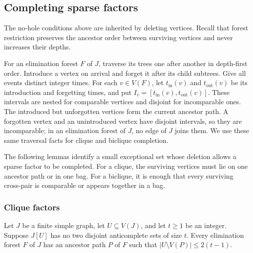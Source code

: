 \subsection{Completing sparse factors}

The no-hole conditions above are inherited by deleting vertices. Recall that
forest restriction preserves the ancestor order between surviving
vertices and never increases their depths.

For an elimination forest $F$ of $J$, traverse its trees one after
another in depth-first order. Introduce a vertex on arrival and forget it after
its child subtrees. Give all events distinct integer times. For each
$v\in V(F)$, let $t_{\mathrm{in}}(v)$ and $t_{\mathrm{out}}(v)$ be its
introduction and forgetting times, and put
$I_v=[t_{\mathrm{in}}(v),t_{\mathrm{out}}(v)]$. These intervals are
nested for comparable vertices and disjoint for incomparable ones.
The introduced but unforgotten vertices form the current ancestor
path. A forgotten vertex and an unintroduced vertex have disjoint
intervals, so they are incomparable; in an elimination forest of $J$,
no edge of $J$ joins them. We use these same traversal facts for
clique and biclique completion.

The following lemmas identify a small exceptional set whose deletion
allows a sparse factor to be completed. For a clique, the surviving
vertices must lie on one ancestor path or in one bag. For a biclique,
it is enough that every surviving cross-pair is comparable or appears
together in a bag.

\subsubsection{Clique factors}

\begin{lemma}\label{lem:sparse-clique-completion}
Let $J$ be a finite simple graph, let $U\subseteq V(J)$, and let
$t\ge1$ be an integer. Suppose $J[U]$ has no two disjoint
anticomplete sets of size $t$. Every elimination forest $F$ of $J$ has an
ancestor path $P$ of $F$ such that
$|U\setminus V(P)|\leq2(t-1)$.
\end{lemma}

